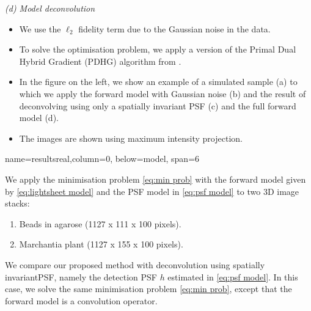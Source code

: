 \documentclass[a0paper,portrait,fontscale=0.35]{baposter}
\newcommand{\mycaption}[1]{
  {
    \smaller
    \emph{#1}
  }
}
\theoremstyle{plain}
\theoremstyle{plain}
\theoremstyle{definition}
\theoremstyle{plain}
\theoremstyle{definition}
\begin{document}
\begin{poster}
{\begin{minipage}[t]{0.55\textwidth}
\begin{minipage}[t]{0.49\textwidth}
        \vspace{0.3em}
        \mycaption{
          (d) Model deconvolution
        }
      \end{minipage}
    \end{minipage}
    \hspace{-0.5em}
    \begin{minipage}[t]{0.45\textwidth}
      \begin{itemize}
        \item  We use the $\ell_2$ fidelity term due to the Gaussian
          noise in the data. 

        \item To solve the optimisation problem, we apply a version
          of the Primal Dual Hybrid Gradient (PDHG) 
          algorithm from \cite{Boulanger2018,Condat2013}.

        \item In the figure on the left, we show an example of a simulated sample (a) 
          to which we apply the forward model with Gaussian noise (b)
          and the result of deconvolving using only a spatially invariant
          PSF (c) and the full forward model (d). 

        \item The images are shown 
          using maximum intensity projection.
      \end{itemize}
    \end{minipage}
}

{name=resultsreal,column=0, below=model, span=6}{
  \begin{minipage}[t]{0.33\textwidth} 
 
    \vspace{1em}
    We apply the minimisation problem \eqref{eq:min prob}
    with the forward model given by \eqref{eq:lightsheet model}
    and the PSF model in \eqref{eq:psf model}
    to two 3D image stacks: 
    \begin{enumerate} 
      \item Beads in agarose (1127 x 111 x 100 pixels).

      \item Marchantia plant (1127 x 155 x 100 pixels).
    \end{enumerate}

    We compare our proposed method with deconvolution using
    spatially invariantPSF, namely the detection PSF $h$
    estimated in \eqref{eq:psf model}. In this case,
    we solve the same minimisation problem \eqref{eq:min prob}, 
    except that the forward model is a convolution
    operator.


\end{minipage}}
\end{poster}
\end{document}
